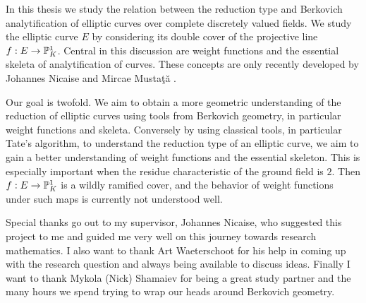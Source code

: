 In this thesis we study the relation between the reduction type and Berkovich analytification of elliptic curves over complete discretely valued fields. 
We study the elliptic curve $E$ by considering its double cover of the projective line $f:E \to \mathbb{P}^{1}_K$.
Central in this discussion are weight functions and the essential skeleta of analytification of curves. 
These concepts are only recently developed by Johannes Nicaise and Mircae Mustaţă \cite{mustataWeightFunctionsNonArchimedean2015}.

Our goal is twofold. We aim to obtain a more geometric understanding of the reduction of elliptic curves using tools from Berkovich geometry, in particular weight functions and skeleta. 
Conversely by using classical tools, in particular Tate's algorithm, to understand the reduction type of an elliptic curve, we aim to gain a better understanding of weight functions and the essential skeleton. 
This is especially important when the residue characteristic of the ground field is $2$. 
Then $f: E \to \mathbb{P}^{1}_K$ is a wildly ramified cover, and the behavior of weight functions under such maps is currently not understood well.  

\medskip

Special thanks go out to my supervisor, Johannes Nicaise, who suggested this project to me and guided me very well on this journey towards research mathematics. 
I also want to thank Art Waeterschoot for his help in coming up with the research question and always being available to discuss ideas. 
Finally I want to thank Mykola (Nick) Shamaiev for being a great study partner and the many hours we spend trying to wrap our heads around Berkovich geometry. 

